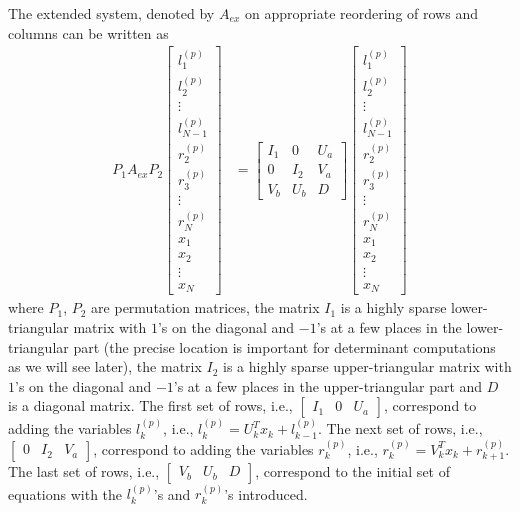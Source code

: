 \documentclass[final,leqno]{siamltex}
\begin{document}
The extended system, denoted by $A_{ex}$ on appropriate reordering of rows and columns can be written as
\begin{align}
P_1A_{ex} P_2
\begin{bmatrix}
l_1^{(p)}\\
l_2^{(p)}\\
\vdots\\
l_{N-1}^{(p)}\\
r_2^{(p)}\\
r_3^{(p)}\\
\vdots\\
r_N^{(p)}\\
x_1\\
x_2\\
\vdots\\
x_N
\end{bmatrix} & =
\begin{bmatrix}
I_1 & 0 & U_a\\
0 & I_2 & V_a\\
V_b & U_b & D
\end{bmatrix}
\begin{bmatrix}
l_1^{(p)}\\
l_2^{(p)}\\
\vdots\\
l_{N-1}^{(p)}\\
r_2^{(p)}\\
r_3^{(p)}\\
\vdots\\
r_N^{(p)}\\
x_1\\
x_2\\
\vdots\\
x_N
\end{bmatrix}
\end{align}
where $P_1$, $P_2$ are permutation matrices, the matrix $I_1$ is a highly sparse lower-triangular matrix with $1$'s on the diagonal and $-1$'s at a few places in the lower-triangular part (the precise location is important for determinant computations as we will see later), the matrix $I_2$ is a highly sparse upper-triangular matrix with $1$'s on the diagonal and $-1$'s at a few places in the upper-triangular part and $D$ is a diagonal matrix. The first set of rows, i.e., $\begin{bmatrix} I_1 & 0 & U_a\end{bmatrix}$, correspond to adding the variables $l_k^{(p)}$, i.e., $l_k^{(p)} = U_k^Tx_k + l_{k-1}^{(p)}$. The next set of rows, i.e., $\begin{bmatrix} 0 & I_2 & V_a\end{bmatrix}$, correspond to adding the variables $r_k^{(p)}$, i.e., $r_k^{(p)} = V_k^Tx_k + r_{k+1}^{(p)}$. The last set of rows, i.e., $\begin{bmatrix} V_b & U_b & D\end{bmatrix}$, correspond to the initial set of equations with the $l_k^{(p)}$'s and $r_k^{(p)}$'s introduced.
\end{document}
